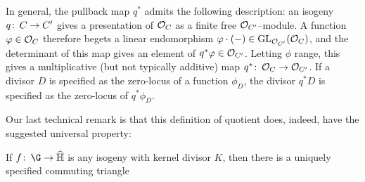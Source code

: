 \begin{remark}
In general, the pullback map \(q^*\) admits the following description: an isogeny \(q\colon\thinspace C \to C'\) gives a presentation of \(\mathcal{O}_C\) as a finite free \(\mathcal{O}_{C'}\)--module.  A function \(\varphi \in \mathcal{O}_C\) therefore begets a linear endomorphism \(\varphi \cdot (-) \in \operatorname{GL}_{\mathcal{O}_{C'}}(\mathcal{O}_C)\), and the determinant of this map gives an element of \(q^* \varphi \in \mathcal{O}_{C'}\).  Letting \(\phi\) range, this gives a multiplicative (but not typically additive) map \(q^*\colon\thinspace \mathcal{O}_C \to \mathcal{O}_{C'}\).  If a divisor \(D\) is specified as the zero-locus of a function \(\phi_D\), the divisor \(q^* D\) is specified as the zero-locus of \(q^* \phi_D\).
\end{remark}

Our last technical remark is that this definition of quotient does, indeed, have the suggested universal property:

\begin{lemma}
If \(f\co \G \to \widehat{\mathbb H}\) is any isogeny with kernel divisor \(K\), then there is a uniquely specified commuting triangle
\begin{center}
\end{center}
\end{lemma}

